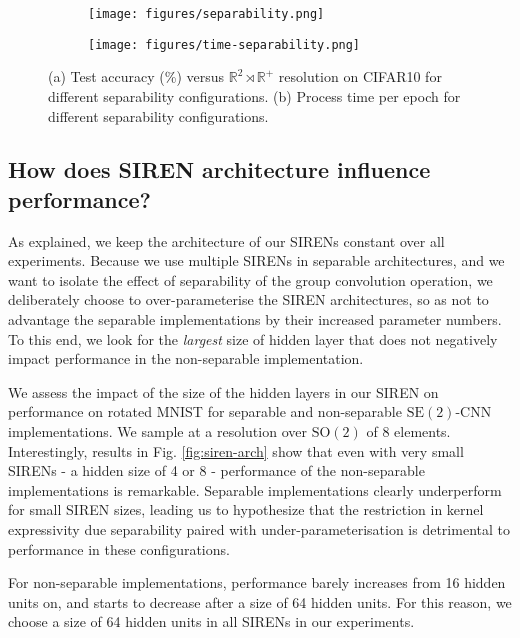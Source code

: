 \documentclass[nohyperref]{article}
\theoremstyle{plain}
\theoremstyle{definition}
\theoremstyle{remark}
\begin{document}
\begin{figure}
    \centering
    \begin{subfigure}{0.49\textwidth}
        \texttt{[image: figures/separability.png]}
        \caption{}
        \label{fig:sepconfig}
    \end{subfigure}
    \begin{subfigure}{0.49\textwidth}
        \texttt{[image: figures/time-separability.png]}
        \caption{}
        \label{fig:time-sep}
    \end{subfigure}
    \caption{(a) Test accuracy (\%) versus $\mathbb{R}^2 \rtimes \mathbb{R}^+$ resolution on CIFAR10 for different separability configurations. (b) Process time per epoch for different separability configurations.}
    \label{fig:separability}
\end{figure}



\subsection{How does SIREN architecture influence performance?} \label{app:overparameterisedsirens}
As explained, we keep the architecture of our SIRENs constant over all experiments. Because we use multiple SIRENs in separable architectures, and we want to isolate the effect of separability of the group convolution operation, we deliberately choose to over-parameterise the SIREN architectures, so as not to advantage the separable implementations by their increased parameter numbers. To this end, we look for the \textit{largest} size of hidden layer that does not negatively impact performance in the non-separable implementation.

We assess the impact of the size of the hidden layers in our SIREN on performance on rotated MNIST for separable and non-separable $\mathrm{SE(2)}$-CNN implementations. We sample at a resolution over $\mathrm{SO(2)}$ of 8 elements. Interestingly, results in Fig. \ref{fig:siren-arch} show that even with very small SIRENs - a hidden size of 4 or 8 - performance of the non-separable implementations is remarkable. Separable implementations clearly underperform for small SIREN sizes, leading us to hypothesize that the restriction in kernel expressivity due separability paired with under-parameterisation is detrimental to performance in these configurations.

For non-separable implementations, performance barely increases from 16 hidden units on, and starts to decrease after a size of 64 hidden units. For this reason, we choose a size of 64 hidden units in all SIRENs in our experiments.
\end{document}
